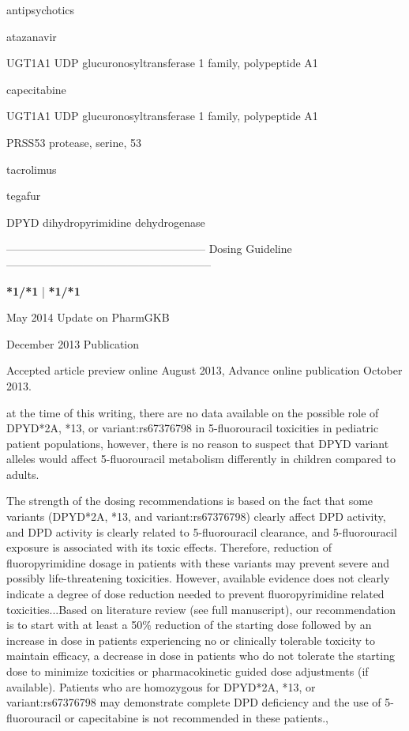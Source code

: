 \documentclass{resume} %
\begin{document}
\begin{rSection}{ antipsychotics }
\begin{rSection}{ atazanavir }
\begin{rSubsection}{ UGT1A1 }{ UDP glucuronosyltransferase 1 family, polypeptide A1 }{}{}
\begin{rSection}{ capecitabine }
\begin{rSubsection}{ UGT1A1 }{ UDP glucuronosyltransferase 1 family, polypeptide A1 }{}{}
\begin{rSubsection}{ PRSS53 }{ protease, serine, 53 }{}{}
\begin{rSection}{ tacrolimus }
\begin{rSection}{ tegafur }
\item[]
\begin{rSubsection}{ DPYD }{ dihydropyrimidine dehydrogenase }{}{}
\item[]
\item[] ------------------------------------------------------ Dosing Guideline --------------------------------------------------------\newline
\item[]
\item[] \textbf{ *1/*1 } | \textbf{ *1/*1 }
\item May 2014 Update on PharmGKB
 \newline
\item December 2013 Publication
 \newline
\item Accepted article preview online August 2013,  Advance online publication October 2013.
 \newline
\item at the time of this writing, there are no data available on the possible role of DPYD*2A, *13, or variant:rs67376798 in 5-fluorouracil toxicities in pediatric patient populations,  however, there is no reason to suspect that DPYD variant alleles would affect 5-fluorouracil metabolism differently in children compared to adults.
 \newline
\item The strength of the dosing recommendations is based on the fact that some variants (DPYD*2A, *13, and variant:rs67376798) clearly affect DPD activity, and DPD activity is clearly related to 5-fluorouracil clearance, and 5-fluorouracil exposure is associated with its toxic effects. Therefore, reduction of fluoropyrimidine dosage in patients with these variants may prevent severe and possibly life-threatening toxicities. However, available evidence does not clearly indicate a degree of dose reduction needed to prevent fluoropyrimidine related toxicities...Based on literature review (see full manuscript), our recommendation is to start with at least a 50\% reduction of the starting dose followed by an increase in dose in patients experiencing no or clinically tolerable toxicity to maintain efficacy, a decrease in dose in patients who do not tolerate the starting dose to minimize toxicities or pharmacokinetic guided dose adjustments (if available). Patients who are homozygous for DPYD*2A, *13, or variant:rs67376798 may demonstrate complete DPD deficiency and the use of 5-fluorouracil or capecitabine is not recommended in these patients.,  

\end{rSubsection}
\end{rSection}
\end{rSection}
\end{rSubsection}
\end{rSubsection}
\end{rSection}
\end{rSubsection}
\end{rSection}
\end{rSection}
\end{document}
